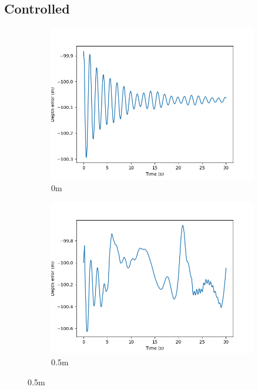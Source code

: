 \documentclass[class=article, crop=false]{standalone}
\begin{document}
\subsection{Controlled}
\begin{figure}
    \centering
    \begin{subfigure}[b]{0.48\textwidth}
        \centering
        \includegraphics{scenario1/rov-0m/0.0m/rov_depth_error_controlled}
        \caption{0m}
        \label{}
    \end{subfigure}
    \hfill
    \begin{subfigure}[b]{0.48\textwidth}
        \centering
        \includegraphics{scenario1/rov-0m/0.5m/rov_depth_error_controlled}
        \caption{0.5m}

\end{subfigure}
\end{figure}
\end{document}
